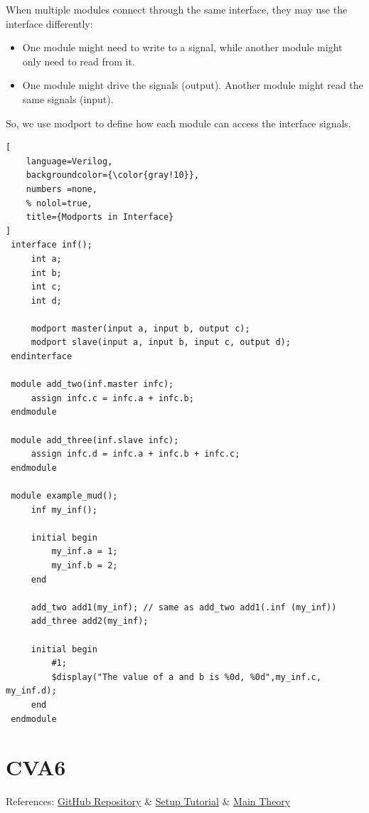 \documentclass[12pt, a4paper]{article}
\begin{document}
\vspace{0.3em}

When multiple modules connect through the same interface, they may use the interface differently:

\begin{itemize}[nosep]
    \item One module might need to write to a signal, while another module might only need to read from it.
    \item One module might drive the signals (output). Another module might read the same signals (input).
\end{itemize}

\vspace{0.3em}

So, we use modport to define how each module can access the interface signals.

\begin{lstlisting}[
    language=Verilog,
    backgroundcolor={\color{gray!10}},
    numbers =none,
    % nolol=true,
    title={Modports in Interface}
]
 interface inf();
     int a;
     int b;
     int c;
     int d;
     
     modport master(input a, input b, output c);
     modport slave(input a, input b, input c, output d);
 endinterface
 
 module add_two(inf.master infc);
     assign infc.c = infc.a + infc.b;
 endmodule
 
 module add_three(inf.slave infc);
     assign infc.d = infc.a + infc.b + infc.c;
 endmodule
 
 module example_mud();
     inf my_inf();
     
     initial begin
         my_inf.a = 1;
         my_inf.b = 2;
     end
     
     add_two add1(my_inf); // same as add_two add1(.inf (my_inf))
     add_three add2(my_inf);
     
     initial begin
         #1;
         $display("The value of a and b is %0d, %0d",my_inf.c, my_inf.d);
     end
 endmodule
\end{lstlisting}

\section{CVA6}

References: \href{https://github.com/openhwgroup/cva6}{GitHub Repository} \&
\href{https://github.com/VedantPahariya/cva6/blob/master/tutorials/running_sim.md}{Setup Tutorial} \& \href{https://cva6.readthedocs.io/en/latest/03_cva6_design/intro.html}{Main Theory}
\end{document}
